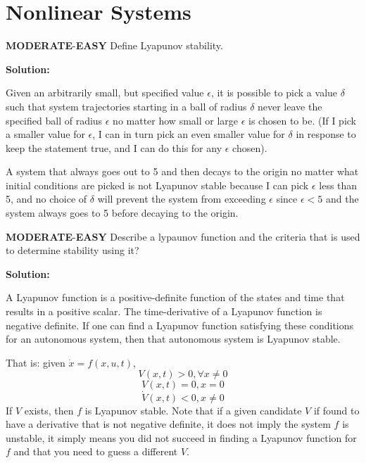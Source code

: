 \documentclass{article}
\newenvironment{Solution}{
\begin{tcolorbox}
\color{purple}
\textbf{Solution:}
}
{
\end{tcolorbox}
\ignorespacesafterend
}
\newcommand{\RatingBase}[2]{\textcolor{#1}{{\fontfamily{phv}\selectfont\textbf{#2}}}}
\newcommand{\Easy}{\RatingBase{green!50!black!50}{EASY}}
\newcommand{\Moderate}{\RatingBase{yellow!50!black!50}{MODERATE}}
\begin{document}
\section{Nonlinear Systems} \Moderate{}-\Easy{}
Define Lyapunov stability. 


\begin{Solution}
Given an arbitrarily small, but specified value $\epsilon$, it is possible to pick a value $\delta$ such that system trajectories starting in a ball of radius $\delta$ never leave the specified ball of radius $\epsilon$ no matter how small or large $\epsilon$ is chosen to be.  (If I pick a smaller value for $\epsilon$, I can in turn pick an even smaller value for $\delta$ in response to keep the statement true, and I can do this for any $\epsilon$ chosen).

A system that always goes out to 5 and then decays to the origin no matter what initial conditions are picked is not Lyapunov stable because I can pick $\epsilon$ less than 5, and no choice of $\delta$ will prevent the system from exceeding $\epsilon$ since $\epsilon < 5$ and the system always goes to 5 before decaying to the origin.
\end{Solution}

\Moderate{}-\Easy{} Describe a lypaunov function and the criteria that is used to determine stability using it?
\begin{Solution}
A Lyapunov function is a positive-definite function of the states and time that results in a positive scalar.  The time-derivative of a Lyapunov function is negative definite.  If one can find a Lyapunov function satisfying these conditions for an autonomous system, then that autonomous system is Lyapunov stable.

That is:
given  $\dot{x}=f(x,u,t)$,
\begin{equation}
V(x,t) > 0, \forall x \ne {0}
\end{equation}
\begin{equation}
V(x,t) = 0,  x = {0}
\end{equation}
\begin{equation}
\dot{V}(x,t) < 0,  x \ne {0}
\end{equation}
If $V$ exists, then $f$ is Lyapunov stable.  Note that if a given candidate $V$ if found to have a derivative that is not negative definite, it does not imply the system $f$ is unstable, it simply means you did not succeed in finding a Lyapunov function for $f$ and that you need to guess a different $V$.
\end{Solution}
\end{document}
